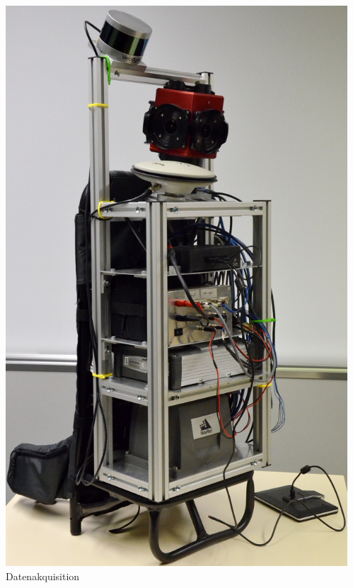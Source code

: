 \documentclass[aspectratio=169]{beamer}
\begin{document}
\begin{frame}
\begin{columns}[onlytextwidth]
\begin{column}{0.33\textwidth}
      \includegraphics[height=0.7\textheight]{./Abbildungen/cappro_2.JPG}
      \\
      Datenakquisition
    \end{column}
    \begin{column}{0.33\textwidth}

\end{column}
\end{columns}
\end{frame}
\end{document}
